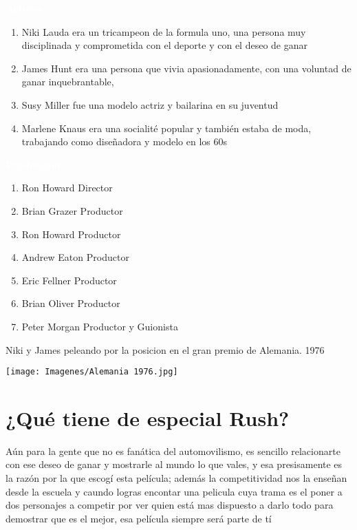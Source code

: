 \documentclass[ä5paper, 11pt]{article}
\begin{document}
\begin{multicols}{2}
\textbf{\textcolor{white}{Actores}}
\begin{enumerate}

    \item {} Niki Lauda era un tricampeon de la formula uno, una persona muy disciplinada y comprometida con el deporte y con el deseo de ganar
    \item {} James Hunt era una persona que vivia apasionadamente, con una voluntad de ganar inquebrantable, 
    \item {} Susy Miller fue una modelo actriz y bailarina en su juventud
    \item {}  Marlene Knaus era una socialité popular y también estaba de moda, trabajando como diseñadora y modelo en los 60s
    
\end{enumerate}
\columnbreak
\textbf{\textcolor{white}{Producción}}
\begin{enumerate}
    \item Ron Howard Director
    \item 	Brian Grazer Productor
    \item Ron Howard Productor
    \item Andrew Eaton Productor
    \item Eric Fellner Productor
    \item Brian Oliver Productor
    \item Peter Morgan Productor y Guionista
\end{enumerate}
\end{multicols}


Niki y James peleando por la posicion en el gran premio de Alemania. 1976

\texttt{[image: Imagenes/Alemania 1976.jpg]}
   

\newpage
\section*{¿Qué tiene de especial Rush?}

\textcolor{azul}{
Aún para la gente que no es fanática del automovilismo, es sencillo relacionarte con ese deseo de ganar y mostrarle al mundo lo que vales, y esa presisamente es la razón por la que escogí esta película; además la competitividad nos la enseñan desde la escuela y caundo logras encontar una pelicula cuya trama es el poner a dos personajes a competir por ver quien está mas dispuesto a darlo todo para demostrar que es el mejor, esa película siempre será parte de tí}\\
\end{document}
